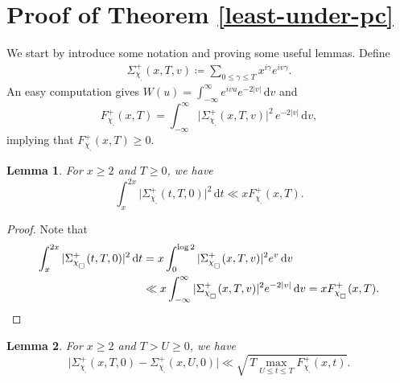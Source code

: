 \documentclass[pdflatex]{sn-jnl}%
\newcommand{\dx}{\mathrm{d}}
\theoremstyle{sltheorems}
\newtheorem{lem}{Lemma}
\theoremstyle{plainrem}
\theoremstyle{definition}
\begin{document}
\section{Proof of Theorem \ref{least-under-pc}}
We start by introduce some notation and proving some useful lemmas.
Define \begin{align}
\label{Sigma-plus-def}
\Sigma^+_{\chi_{_\square}}(x,T,v)
\coloneq
\sum_{0 \le  \gamma \le T} x^{i\gamma}e^{iv\gamma}.
\end{align}
An easy computation gives
$W(u) = \int_{-\infty}^{\infty} e^{ivu}e^{-2 \vert v \vert }\, \dx v$ and
\begin{equation*}
F^+_{\chi_{_\square}}(x,T) = 
\int_{-\infty}^{\infty} \vert \Sigma^+_{\chi_{_\square}}(x,T,v) \vert ^2\,e^{-2 \vert v \vert }\, \dx v,
\end{equation*}
implying that $F^+_{\chi_{_\square}}(x,T)\ge 0$.

\begin{lem}\label{lemlpq}
For $x\ge 2$ and $T\ge 0$, we have 
\begin{equation*}
\int_{x}^{2x} \vert \Sigma^+_{\chi_{_\square}}(t,T,0)  \vert^2 \, \dx t 
\ll 
 x F^+_{\chi_{_\square}}(x, T).  
\end{equation*}
\end{lem}
%
\begin{proof} Note that
% 
\begin{align*}
\int_{x}^{2x} \vert\Sigma^+_{\chi_{_\square}}(t,T,0) \vert^2 \, \dx t 
&= x \int_{0}^{\log 2} \vert\Sigma^+_{\chi_{_\square}}(x,T,v) \vert^2 e^{v} \, \dx v \nonumber\\
&\ll 
x \int_{-\infty}^{\infty}  \vert\Sigma^+_{\chi_{_\square}}(x,T,v) \vert^2 e^{-2 \vert v \vert } \, \dx v
= 
x F^+_{\chi_{_\square}}(x, T).
\qed
\end{align*}
\renewcommand{\qed}{}
\end{proof}


\begin{lem}\label{lem3}
For $x\ge 2$ and $T > U \ge 0$, we have 
\[
\vert
\Sigma^+_{\chi_{_\square}}(x,T,0) - \Sigma^+_{\chi_{_\square}}(x,U,0)
\vert
\ll 
\sqrt{\, T \max_{U \le  t \le T} F^+_{\chi_{_\square}}(x,t)}.
\]
\end{lem}
\end{document}
